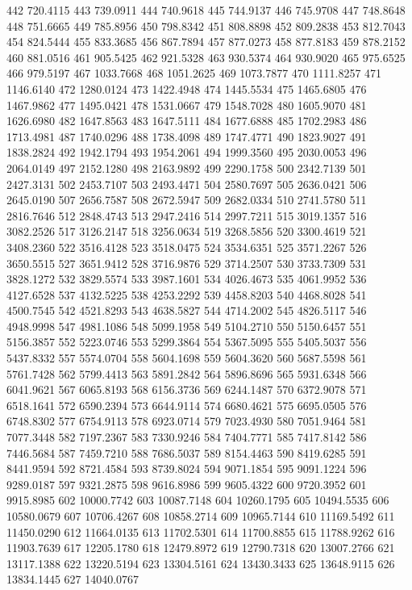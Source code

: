 442 720.4115
443 739.0911
444 740.9618
445 744.9137
446 745.9708
447 748.8648
448 751.6665
449 785.8956
450 798.8342
451 808.8898
452 809.2838
453 812.7043
454 824.5444
455 833.3685
456 867.7894
457 877.0273
458 877.8183
459 878.2152
460 881.0516
461 905.5425
462 921.5328
463 930.5374
464 930.9020
465 975.6525
466 979.5197
467 1033.7668
468 1051.2625
469 1073.7877
470 1111.8257
471 1146.6140
472 1280.0124
473 1422.4948
474 1445.5534
475 1465.6805
476 1467.9862
477 1495.0421
478 1531.0667
479 1548.7028
480 1605.9070
481 1626.6980
482 1647.8563
483 1647.5111
484 1677.6888
485 1702.2983
486 1713.4981
487 1740.0296
488 1738.4098
489 1747.4771
490 1823.9027
491 1838.2824
492 1942.1794
493 1954.2061
494 1999.3560
495 2030.0053
496 2064.0149
497 2152.1280
498 2163.9892
499 2290.1758
500 2342.7139
501 2427.3131
502 2453.7107
503 2493.4471
504 2580.7697
505 2636.0421
506 2645.0190
507 2656.7587
508 2672.5947
509 2682.0334
510 2741.5780
511 2816.7646
512 2848.4743
513 2947.2416
514 2997.7211
515 3019.1357
516 3082.2526
517 3126.2147
518 3256.0634
519 3268.5856
520 3300.4619
521 3408.2360
522 3516.4128
523 3518.0475
524 3534.6351
525 3571.2267
526 3650.5515
527 3651.9412
528 3716.9876
529 3714.2507
530 3733.7309
531 3828.1272
532 3829.5574
533 3987.1601
534 4026.4673
535 4061.9952
536 4127.6528
537 4132.5225
538 4253.2292
539 4458.8203
540 4468.8028
541 4500.7545
542 4521.8293
543 4638.5827
544 4714.2002
545 4826.5117
546 4948.9998
547 4981.1086
548 5099.1958
549 5104.2710
550 5150.6457
551 5156.3857
552 5223.0746
553 5299.3864
554 5367.5095
555 5405.5037
556 5437.8332
557 5574.0704
558 5604.1698
559 5604.3620
560 5687.5598
561 5761.7428
562 5799.4413
563 5891.2842
564 5896.8696
565 5931.6348
566 6041.9621
567 6065.8193
568 6156.3736
569 6244.1487
570 6372.9078
571 6518.1641
572 6590.2394
573 6644.9114
574 6680.4621
575 6695.0505
576 6748.8302
577 6754.9113
578 6923.0714
579 7023.4930
580 7051.9464
581 7077.3448
582 7197.2367
583 7330.9246
584 7404.7771
585 7417.8142
586 7446.5684
587 7459.7210
588 7686.5037
589 8154.4463
590 8419.6285
591 8441.9594
592 8721.4584
593 8739.8024
594 9071.1854
595 9091.1224
596 9289.0187
597 9321.2875
598 9616.8986
599 9605.4322
600 9720.3952
601 9915.8985
602 10000.7742
603 10087.7148
604 10260.1795
605 10494.5535
606 10580.0679
607 10706.4267
608 10858.2714
609 10965.7144
610 11169.5492
611 11450.0290
612 11664.0135
613 11702.5301
614 11700.8855
615 11788.9262
616 11903.7639
617 12205.1780
618 12479.8972
619 12790.7318
620 13007.2766
621 13117.1388
622 13220.5194
623 13304.5161
624 13430.3433
625 13648.9115
626 13834.1445
627 14040.0767
